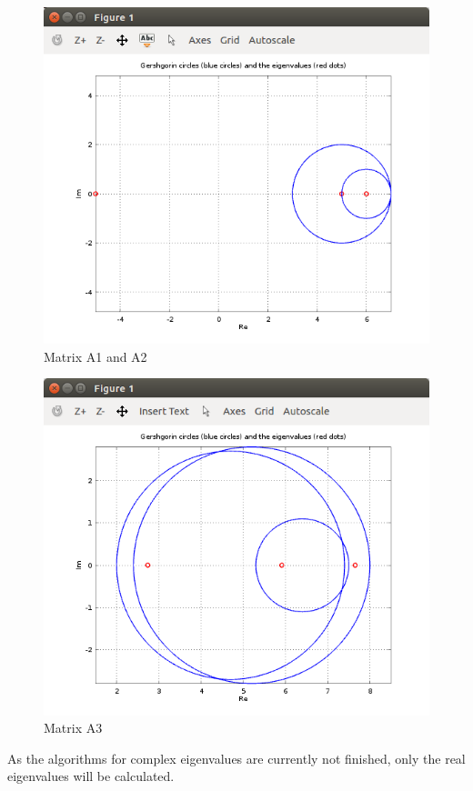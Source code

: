 \documentclass[eng,openany]{mgr}
\begin{document}
\begin{figure}[h]
\centering
\includegraphics[width=0.5\linewidth]{screenshot011}
\caption{Matrix A1 and A2}
\label{fig:screenshot011}
\end{figure}

\begin{figure}[h]
\centering
\includegraphics[width=0.7\linewidth]{screenshot012}
\caption{Matrix A3}
\label{fig:screenshot012}
\end{figure}
\newpage
As the algorithms for complex eigenvalues are currently not finished, only the real eigenvalues will be calculated.
\end{document}
